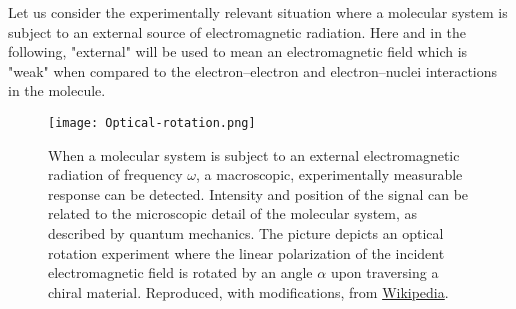 Let us consider the experimentally relevant situation where a molecular
system is subject to an external source of electromagnetic radiation.
Here and in the following, "external" will be used to mean an
electromagnetic field which is "weak" when compared to the
electron--electron and electron--nuclei interactions in the molecule.

\begin{figure}[tb]
  \centering
  \texttt{[image: Optical-rotation.png]}
  \caption{
  When a molecular system is subject to an external electromagnetic
  radiation of frequency $\omega$, a macroscopic, experimentally
  measurable response can be detected.
  Intensity and position of the signal can be related to the microscopic
  detail of the molecular system, as described by quantum mechanics.
  The picture depicts an optical rotation experiment where
  the linear polarization of the incident electromagnetic field
  is rotated by an angle $\alpha$ upon traversing a chiral material.
  Reproduced, with modifications, from \href{https://commons.wikimedia.org/wiki/File:Optical-rotation.svg}{Wikipedia}.
  }
  \label{fig:OR}
\end{figure}

